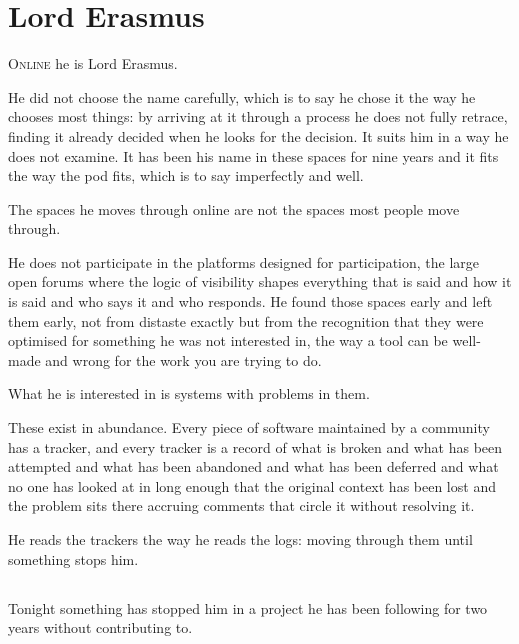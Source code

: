 
\chapter{Lord Erasmus}


\lettrine{O}{nline} he is Lord Erasmus.

He did not choose the name carefully, which is to
say he chose it the way he chooses most things:
by arriving at it through a process he does not
fully retrace, finding it already decided when he
looks for the decision. It suits him in a way he
does not examine. It has been his name in these
spaces for nine years and it fits the way the pod
fits, which is to say imperfectly and well.

The spaces he moves through online are not the
spaces most people move through.

He does not participate in the platforms designed
for participation, the large open forums where
the logic of visibility shapes everything that
is said and how it is said and who says it and
who responds. He found those spaces early and
left them early, not from distaste exactly but
from the recognition that they were optimised
for something he was not interested in, the way
a tool can be well-made and wrong for the work
you are trying to do.

What he is interested in is systems with problems
in them.

These exist in abundance. Every piece of software
maintained by a community has a tracker, and every
tracker is a record of what is broken and what has
been attempted and what has been abandoned and what
has been deferred and what no one has looked at in
long enough that the original context has been lost
and the problem sits there accruing comments that
circle it without resolving it.

He reads the trackers the way he reads the logs:
moving through them until something stops him.

\section{}

Tonight something has stopped him in a project
he has been following for two years without
contributing to.

